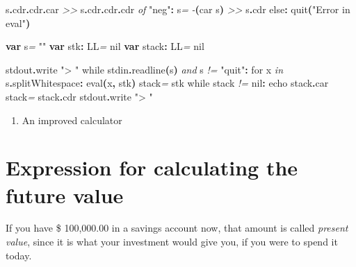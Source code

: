 \documentclass[
  12pt,
]{book}
\newenvironment{Shaded}{}{}
\newcommand{\CommentTok}[1]{\textcolor[rgb]{0.38,0.63,0.69}{\textit{#1}}}
\newcommand{\DataTypeTok}[1]{\textcolor[rgb]{0.56,0.13,0.00}{#1}}
\newcommand{\FloatTok}[1]{\textcolor[rgb]{0.25,0.63,0.44}{#1}}
\newcommand{\KeywordTok}[1]{\textcolor[rgb]{0.00,0.44,0.13}{\textbf{#1}}}
\newcommand{\NormalTok}[1]{#1}
\newcommand{\StringTok}[1]{\textcolor[rgb]{0.25,0.44,0.63}{#1}}
\providecommand{\tightlist}{%
  \setlength{\itemsep}{0pt}\setlength{\parskip}{0pt}}
\begin{document}
\begin{Shaded}
\begin{Highlighting}[]
\NormalTok{                      s}\KeywordTok{.}\DataTypeTok{cdr}\KeywordTok{.}\DataTypeTok{cdr}\KeywordTok{.}\DataTypeTok{car} \CommentTok{\textgreater{}\textgreater{}}\NormalTok{ s}\KeywordTok{.}\DataTypeTok{cdr}\KeywordTok{.}\DataTypeTok{cdr}\KeywordTok{.}\DataTypeTok{cdr}
      \CommentTok{of} \StringTok{"neg"}\KeywordTok{:}\NormalTok{ s}\CommentTok{=} \CommentTok{{-}}\KeywordTok{(}\DataTypeTok{car}\NormalTok{ s}\KeywordTok{)} \CommentTok{\textgreater{}\textgreater{}}\NormalTok{ s}\KeywordTok{.}\DataTypeTok{cdr}
      \DataTypeTok{else}\KeywordTok{:} \DataTypeTok{quit}\KeywordTok{(}\StringTok{"Error in eval"}\KeywordTok{)}

\KeywordTok{var}\NormalTok{ s}\CommentTok{=}  \StringTok{""}
\KeywordTok{var}\NormalTok{ stk}\KeywordTok{:} \DataTypeTok{LL}\CommentTok{=} \FloatTok{nil}
\KeywordTok{var}\NormalTok{ stack}\KeywordTok{:} \DataTypeTok{LL}\CommentTok{=} \FloatTok{nil}

\NormalTok{stdout}\KeywordTok{.}\DataTypeTok{write} \StringTok{"\textgreater{} "}
\DataTypeTok{while}\NormalTok{ stdin}\KeywordTok{.}\DataTypeTok{readline}\KeywordTok{(}\NormalTok{s}\KeywordTok{)} \CommentTok{and}\NormalTok{ s }\CommentTok{!=} \StringTok{"quit"}\KeywordTok{:}
  \DataTypeTok{for}\NormalTok{ x }\CommentTok{in}\NormalTok{ s}\KeywordTok{.}\DataTypeTok{splitWhitespace}\KeywordTok{:}
    \DataTypeTok{eval}\KeywordTok{(}\NormalTok{x}\KeywordTok{,}\NormalTok{ stk}\KeywordTok{)}
\NormalTok{  stack}\CommentTok{=}\NormalTok{ stk}
  \DataTypeTok{while}\NormalTok{ stack }\CommentTok{!=} \FloatTok{nil}\KeywordTok{:}
    \DataTypeTok{echo}\NormalTok{ stack}\KeywordTok{.}\DataTypeTok{car}
\NormalTok{    stack}\CommentTok{=}\NormalTok{ stack}\KeywordTok{.}\DataTypeTok{cdr}
\NormalTok{  stdout}\KeywordTok{.}\DataTypeTok{write} \StringTok{"\textgreater{} "}
\end{Highlighting}
\end{Shaded}

\begin{enumerate}
\def\labelenumi{(\arabic{enumi})}
\setcounter{enumi}{13}
\tightlist
\item
  An improved calculator
\end{enumerate}

\section{Expression for calculating the future
value}\label{expression-for-calculating-the-future-value}

If you have \$ 100,000.00 in a savings account now, that amount is
called \emph{present value}, since it is what your investment would give
you, if you were to spend it today.
\end{document}
